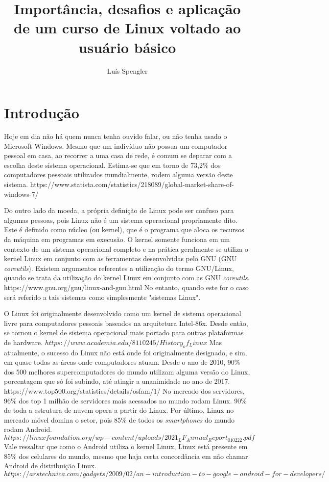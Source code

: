 \documentclass{article}
\title{Importância, desafios e aplicação de um curso de Linux voltado ao usuário básico}
\date{}
\author[1]{Luís Spengler}
\affil[1]{Instituto Federal de Educação, Ciência e Tecnologia de Mato Grosso do Sul}
\begin{document}
\maketitle

\section{Introdução}
Hoje em dia não há quem nunca tenha ouvido falar, ou não tenha usado o Microsoft Windows. Mesmo que um indivíduo não possua um computador pessoal em casa, ao recorrer a uma casa de rede, é comum se deparar com a escolha deste sistema operacional. Estima-se que em torno de 73,2\% dos computadores pessoais utilizados mundialmente, rodem alguma versão deste sistema. https://www.statista.com/statistics/218089/global-market-share-of-windows-7/

Do outro lado da moeda, a própria definição de Linux pode ser confuso para algumas pessoas, pois Linux não é um sistema operacional propriamente dito. Este é definido como núcleo (ou kernel), que é o programa que aloca os recursos da máquina em programas em execusão. O kernel somente funciona em um contexto de um sistema operacional completo e na prática geralmente se utiliza o kernel Linux em conjunto com as ferramentas desenvolvidas pelo GNU (GNU \textit{coreutils}). Existem argumentos referentes a utilização do termo GNU/Linux, quando se trata da utilização do kernel Linux em conjunto com as GNU \textit{coreutils}. https://www.gnu.org/gnu/linux-and-gnu.html No entanto, quando este for o caso será referido a tais sistemas como simplesmente "sistemas Linux".

O Linux foi originalmente desenvolvido como um kernel de sistema operacional livre para computadores pessoais baseados na arquitetura Intel-86x. Desde então, se tornou o kernel de sistema operacional mais portado para outras plataformas de hardware. \(https://www.academia.edu/8110245/History_of_Linux\) Mas atualmente, o sucesso do Linux não está onde foi originalmente designado, e sim, em quase todas as áreas onde computadores atuam. Desde o ano de 2010, 90\% dos 500 melhores supercomputadores do mundo utilizam alguma versão do Linux, porcentagem que só foi subindo, até atingir a unanimidade no ano de 2017. https://www.top500.org/statistics/details/osfam/1/ No mercado dos servidores, 96\% dos top 1 milhão de servidores mais acessados no mundo rodam Linux. 90\% de toda a estrutura de nuvem opera a partir do Linux. Por último, Linux no mercado móvel domina o setor, pois 85\% de todos os \textit{smartphones} do mundo rodam Android. \(https://linuxfoundation.org/wp-content/uploads/2021_LF_Annual_Report_010222.pdf\) Vale ressaltar que como o Android utiliza o kernel Linux, Linux está presente em 85\% dos celulares do mundo, mesmo que haja certa concordância em não chamar Android de distribuição Linux. \(https://arstechnica.com/gadgets/2009/02/an-introduction-to-google-android-for-developers/\)
\end{document}
